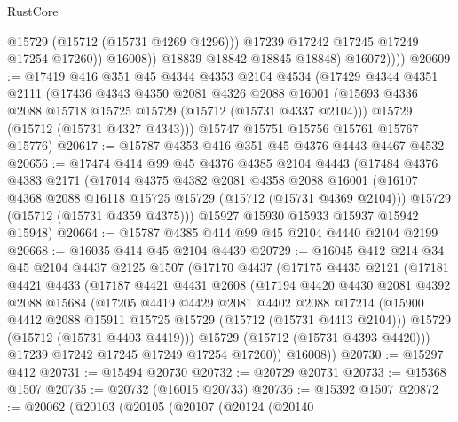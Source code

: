 \begin{lexlean}{RustCore}
\begin{coremodule}
                        @15729
                        (@15712 (@15731 @4269 @4296)))
                      @17239
                      @17242
                      @17245
                      @17249
                      @17254
                      @17260))
                  @16008))
              @18839
              @18842
              @18845
              @18848)
            @16072))))
@20609 := @17419
    @416
    @351
    @45
    @4344
    @4353
    @2104
    @4534
    (@17429
      @4344
      @4351
      @2111
      (@17436
        @4343
        @4350
        @2081
        @4326
        @2088
        @16001
        (@15693 @4336 @2088 @15718 @15725 @15729 (@15712 (@15731 @4337 @2104)))
        @15729
        (@15712 (@15731 @4327 @4343)))
      @15747
      @15751
      @15756
      @15761
      @15767
      @15776)
@20617 := @15787 @4353 @416 @351 @45 @4376 @4443 @4467 @4532
@20656 := @17474
    @414
    @99
    @45
    @4376
    @4385
    @2104
    @4443
    (@17484
      @4376
      @4383
      @2171
      (@17014
        @4375
        @4382
        @2081
        @4358
        @2088
        @16001
        (@16107 @4368 @2088 @16118 @15725 @15729 (@15712 (@15731 @4369 @2104)))
        @15729
        (@15712 (@15731 @4359 @4375)))
      @15927
      @15930
      @15933
      @15937
      @15942
      @15948)
@20664 := @15787 @4385 @414 @99 @45 @2104 @4440 @2104 @2199
@20668 := @16035 @414 @45 @2104 @4439
@20729 := @16045
    @412
    @214
    @34
    @45
    @2104
    @4437
    @2125
    @1507
    (@17170
      @4437
      (@17175
        @4435
        @2121
        (@17181
          @4421
          @4433
          (@17187
            @4421
            @4431
            @2608
            (@17194
              @4420
              @4430
              @2081
              @4392
              @2088
              @15684
              (@17205
                @4419
                @4429
                @2081
                @4402
                @2088
                @17214
                (@15900 @4412 @2088 @15911 @15725 @15729 (@15712 (@15731 @4413 @2104)))
                @15729
                (@15712 (@15731 @4403 @4419)))
              @15729
              (@15712 (@15731 @4393 @4420)))
            @17239
            @17242
            @17245
            @17249
            @17254
            @17260))
        @16008))
@20730 := @15297 @412
@20731 := @15494 @20730
@20732 := @20729 @20731
@20733 := @15368 @1507
@20735 := @20732 (@16015 @20733)
@20736 := @15392 @1507
@20872 := @20062
    (@20103
      (@20105
        (@20107
          (@20124
            (@20140

\end{coremodule}
\end{lexlean}
